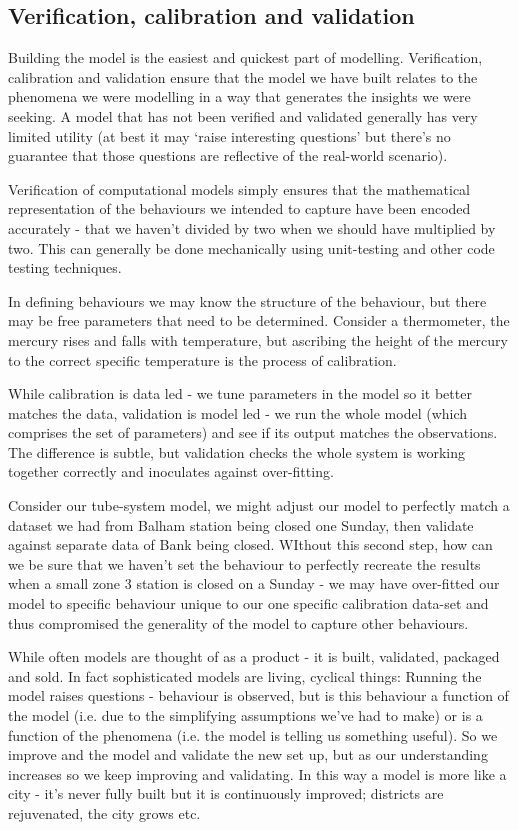 \subsection{Verification, calibration and validation}

Building the model is the easiest and
quickest part of modelling. Verification, calibration and validation ensure
that the model we have built relates to the phenomena we were modelling in a
way that generates the insights we were seeking. A model that has not been
verified and validated generally has very limited utility (at best it may
‘raise interesting questions’ but there’s no guarantee that those questions are
reflective of the real-world scenario).

Verification of computational models simply ensures that the mathematical
representation of the behaviours we intended to capture have been encoded
accurately - that we haven’t divided by two when we should have multiplied by
two. This can generally be done mechanically using unit-testing and other code
testing techniques.

In defining behaviours we may know the structure of the behaviour, but there
may be free parameters that need to be determined. Consider a thermometer, the
mercury rises and falls with temperature, but ascribing the height of the
mercury to the correct specific temperature is the process of calibration.

While calibration is data led - we tune parameters in the model so it better
matches the data, validation is model led - we run the whole model (which
comprises the set of parameters) and see if its output matches the
observations. The difference is subtle, but validation checks the whole system
is working together correctly and inoculates against over-fitting.

Consider our tube-system model, we might adjust our model to perfectly match a
dataset we had from Balham station being closed one Sunday, then validate
against separate data of Bank being closed. WIthout this second step, how can
we be sure that we haven’t set the behaviour to perfectly recreate the results
when a small zone 3 station is closed on a Sunday - we may have over-fitted our
model to specific behaviour unique to our one specific calibration data-set and
thus compromised the generality of the model to capture other behaviours.

While often models are thought of as a product - it is built, validated,
packaged and sold. In fact sophisticated models are living, cyclical things:
Running the model raises questions - behaviour is observed, but is this
behaviour a function of the model (i.e. due to the simplifying assumptions
we’ve had to make) or is a function of the phenomena (i.e. the model is telling
us something useful). So we improve and the model and validate the new set up,
but as our understanding increases so we keep improving and validating. In this
way a model is more like a city - it’s never fully built but it is continuously
improved; districts are rejuvenated, the city grows etc.

